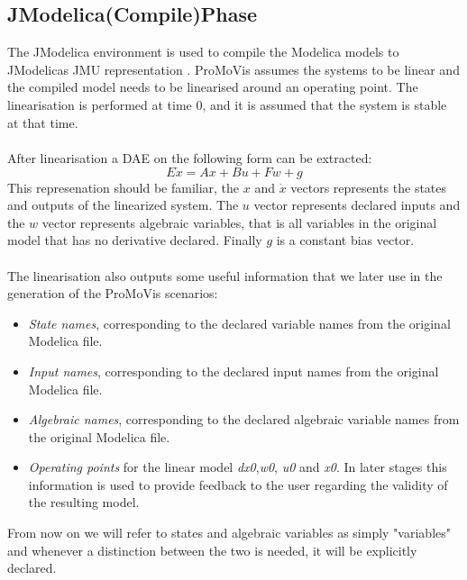 \subsection{JModelica(Compile)Phase}
The JModelica environment is used to compile the Modelica models to JModelicas JMU representation \cite{jmodelicaorg}\nocite{*}. ProMoVis assumes the systems to be linear and the compiled model needs to be linearised around an operating point. The linearisation is performed at time 0, and it is assumed that the system is stable at that time.\\\\After linearisation a DAE on the following form can be extracted:%
\begin{equation}
E\dot{x} = Ax + Bu + Fw + g
\end{equation}%
This represenation should be familiar, the $x$ and $\dot{x}$  vectors represents the states and outputs of the linearized system. The $u$ vector represents declared inputs and the $w$ vector represents algebraic variables, that is all variables in the original model that has no derivative declared. Finally $g$ is a constant bias vector.\\\\The linearisation also outputs some useful information that we later use in the generation of the ProMoVis scenarios:
\begin{itemize}
\item \textit{State names}, corresponding to the declared variable names from the original Modelica file.
\item \textit{Input names}, corresponding to the declared input names from the original Modelica file.
\item \textit{Algebraic names}, corresponding to the declared algebraic variable names from the original Modelica file.
\item \textit{Operating points} for the linear model \textit{dx0},\textit{w0}, \textit{u0} and \textit{x0}. In later stages this information is used to provide feedback to the user regarding the validity of the resulting model.
\end{itemize}
From now on we will refer to states and algebraic variables as simply "variables" and whenever a distinction between the two is needed, it will be explicitly declared.%
